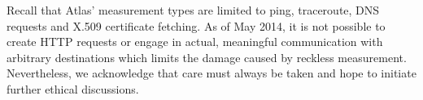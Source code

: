 Recall that Atlas' measurement types are limited to ping, traceroute, DNS
requests and X.509 certificate fetching.  As of May 2014, it is not possible to
create HTTP requests or engage in actual, meaningful communication with
arbitrary destinations which limits the damage caused by reckless measurement.
Nevertheless, we acknowledge that care must always be taken and hope to initiate
further ethical discussions.

